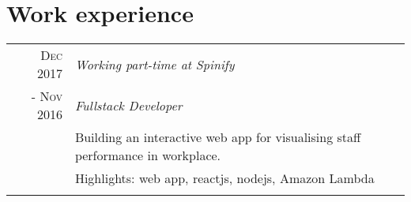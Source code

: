 \documentclass[a4paper,10pt]{article}
\begin{document}
\section{Work experience}
\begin{tabular}{r|p{11cm}}
 \textsc{Dec 2017} & \textit{Working part-time at Spinify} \\\textsc{- Nov 2016}&\emph{Fullstack Developer}\\&\footnotesize{Building an interactive web app for visualising staff performance in workplace.}\\& \footnotesize{Highlights: web app, reactjs, nodejs, Amazon Lambda}\\\multicolumn{2}{c}{}\\
\end{tabular}


\end{document}
